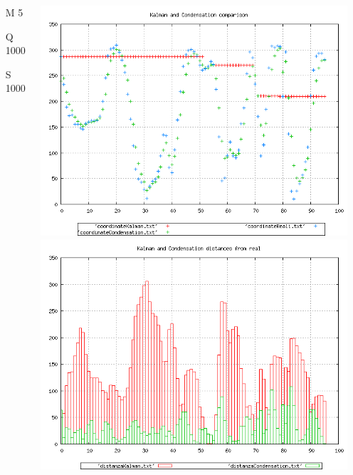{\begin{columns}
\begin{scriptsize}
\begin{itemize}
\item [M]5
\item [Q]1000
\item [S]1000
\end{itemize}
\end{scriptsize}
\includegraphics[scale=0.1]{../esperimenti/tappeto_nozoom/mod_5-Q_1000-S_1000/plot.png}\\
\includegraphics[scale=0.1]{../esperimenti/tappeto_nozoom/mod_5-Q_1000-S_1000/plot-distances.png}



\end{columns}}
